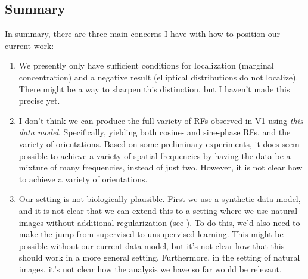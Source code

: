 




\subsection*{Summary}
In summary, there are three main concerns I have with how to position our current work:
\begin{enumerate}
    \item We presently only have sufficient conditions for localization (marginal concentration) and a negative result (elliptical distributions do not localize).
    There might be a way to sharpen this distinction, but I haven't made this precise yet.
    \item I don't think we can produce the full variety of RFs observed in V1 using \emph{this data model}.
    Specifically, yielding both cosine- and sine-phase RFs, and the variety of orientations.
    Based on some preliminary experiments, it does seem possible to achieve a variety of spatial frequencies by having the data be a mixture of many frequencies, instead of just two.
    However, it is not clear how to achieve a variety of orientations.
    \item Our setting is not biologically plausible. 
    First we use a synthetic data model, and it is not clear that we can extend this to a setting where we use natural images without additional regularization (see \cite{redman2023sparsity}).
    To do this, we'd also need to make the jump from supervised to unsupervised learning.
    This might be possible without our current data model, but it's not clear how that this should work in a more general setting.
    Furthermore, in the setting of natural images, it's not clear how the analysis we have so far would be relevant.
\end{enumerate}

